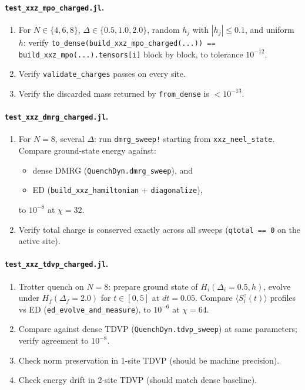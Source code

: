 \documentclass[11pt]{article}
\begin{document}
\paragraph{\texttt{test\_xxz\_mpo\_charged.jl}.}
\begin{enumerate}[leftmargin=2em]
  \item For $N \in \{4, 6, 8\}$, $\Delta \in \{0.5, 1.0, 2.0\}$,
        random $h_j$ with $|h_j| \le 0.1$, and uniform $h$:
        verify \texttt{to\_dense(build\_xxz\_mpo\_charged(...)) == build\_xxz\_mpo(...).tensors[i]}
        block by block, to tolerance $10^{-12}$.
  \item Verify \texttt{validate\_charges} passes on every site.
  \item Verify the discarded mass returned by \texttt{from\_dense} is $< 10^{-13}$.
\end{enumerate}

\paragraph{\texttt{test\_xxz\_dmrg\_charged.jl}.}
\begin{enumerate}[leftmargin=2em]
  \item For $N=8$, several $\Delta$:
        run \texttt{dmrg\_sweep!} starting from \texttt{xxz\_neel\_state}.
        Compare ground-state energy against:
        \begin{itemize}
          \item dense DMRG (\texttt{QuenchDyn.dmrg\_sweep}), and
          \item ED (\texttt{build\_xxz\_hamiltonian} + \texttt{diagonalize}),
        \end{itemize}
        to $10^{-8}$ at $\chi=32$.
  \item Verify total charge is conserved exactly across all sweeps
        (\texttt{qtotal == 0} on the active site).
\end{enumerate}

\paragraph{\texttt{test\_xxz\_tdvp\_charged.jl}.}
\begin{enumerate}[leftmargin=2em]
  \item Trotter quench on $N=8$: prepare ground state of $H_i(\Delta_i=0.5, h)$,
        evolve under $H_f(\Delta_f=2.0)$ for $t \in [0, 5]$ at $dt=0.05$.
        Compare $\langle S_i^z(t)\rangle$ profiles vs ED (\texttt{ed\_evolve\_and\_measure}),
        to $10^{-6}$ at $\chi=64$.
  \item Compare against dense TDVP (\texttt{QuenchDyn.tdvp\_sweep}) at same parameters;
        verify agreement to $10^{-8}$.
  \item Check norm preservation in 1-site TDVP (should be machine precision).
  \item Check energy drift in 2-site TDVP (should match dense baseline).
\end{enumerate}
\end{document}
